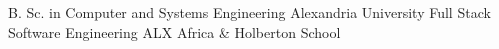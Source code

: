 

\begin{cventries}

  \cventry
    {B. Sc. in Computer and Systems Engineering} %
    {Alexandria University} %
    {} %
    {} %
    {}
    \cventry
    {Full Stack Software Engineering} %
    {ALX Africa \& Holberton School} %
    {} %
    {} %
    {}
\end{cventries}
